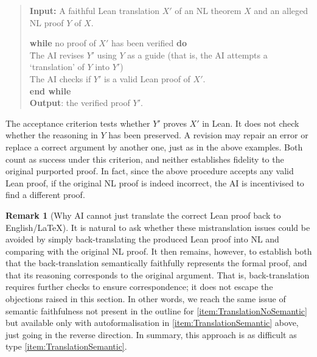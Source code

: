 \documentclass[10pt, a4paper, reqno]{amsart}
\numberwithin{equation}{section}
\theoremstyle{definition}
\newtheorem{remark}[theorem]{Remark}
\theoremstyle{definition}
\begin{document}
\begin{quote}
\textbf{Input:} A faithful Lean translation $X'$ of an NL theorem $X$ and an alleged NL proof $Y$ of $X$.
\begin{tabbing}
\textbf{while} no proof of $X'$ has been verified \textbf{do}\\
\quad\= The AI revises $Y'$ using $Y$ as a guide (that is, the AI attempts a `translation' of $Y$ into $Y'$)\\
\> The AI checks if $Y'$ is a valid Lean proof of $X'$.\\
\textbf{end while}\\
\textbf{Output}: the verified proof $Y'$.
\end{tabbing}
\end{quote}
The acceptance criterion tests whether $Y'$ proves $X'$ in Lean. It does not
check whether the reasoning in $Y$ has been preserved. A revision may
repair an error or replace a correct argument by another one, just as in the above examples. Both count as success under this criterion, and neither establishes fidelity to the original purported proof. In fact, since the above procedure accepts any valid Lean proof, if the original NL proof is indeed incorrect, the AI is incentivised to find a different proof.


\begin{remark}[Why AI cannot just translate the correct Lean proof back to English/LaTeX]
It is natural to ask whether these mistranslation issues could be avoided by simply back-translating the produced Lean proof into NL and comparing with the original NL proof. It then remains, however, to establish both that the back-translation semantically faithfully represents the formal proof, and that its reasoning corresponds to the original argument. That is, back-translation requires further checks to ensure correspondence; it does not escape the objections raised in this section. In other words, we reach the same issue of semantic faithfulness not present in the outline for \ref{item:TranslationNoSemantic} but available only with autoformalisation in \ref{item:TranslationSemantic} above, just going in the reverse direction. In summary, this approach is as difficult as type \ref{item:TranslationSemantic}.
\end{remark}
\end{document}
